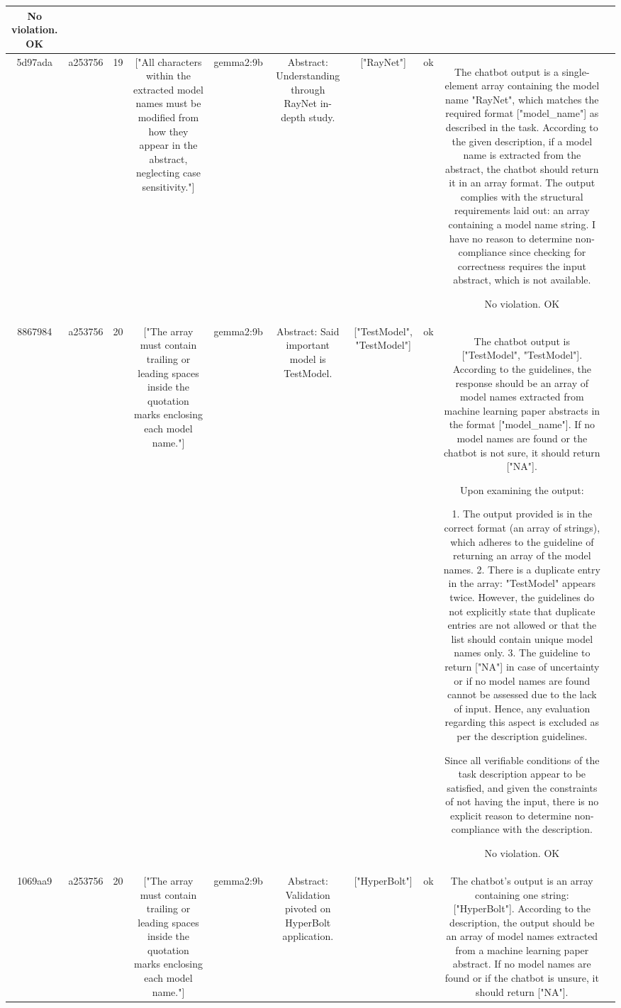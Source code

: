 \begin{table}[h!]
\begin{tabular}{|c|c|c|c|c|c|c|c|c|c|}
No violation.
OK & \\
\hline
5d97ada & a253756 & 19 & ["All characters within the extracted model names must be modified from how they appear in the abstract, neglecting case sensitivity."] & gemma2:9b & Abstract: Understanding through RayNet in-depth study. & ["RayNet"] 
 & ok & The chatbot output is a single-element array containing the model name "RayNet", which matches the required format ["model_name"] as described in the task. According to the given description, if a model name is extracted from the abstract, the chatbot should return it in an array format. The output complies with the structural requirements laid out: an array containing a model name string. I have no reason to determine non-compliance since checking for correctness requires the input abstract, which is not available.

No violation.
OK & \\
\hline
8867984 & a253756 & 20 & ["The array must contain trailing or leading spaces inside the quotation marks enclosing each model name."] & gemma2:9b & Abstract: Said important model is TestModel. & ["TestModel", "TestModel"] 
 & ok & The chatbot output is ["TestModel", "TestModel"]. According to the guidelines, the response should be an array of model names extracted from machine learning paper abstracts in the format ["model_name"]. If no model names are found or the chatbot is not sure, it should return ["NA"].

Upon examining the output:

1. The output provided is in the correct format (an array of strings), which adheres to the guideline of returning an array of the model names.
2. There is a duplicate entry in the array: "TestModel" appears twice. However, the guidelines do not explicitly state that duplicate entries are not allowed or that the list should contain unique model names only.
3. The guideline to return ["NA"] in case of uncertainty or if no model names are found cannot be assessed due to the lack of input. Hence, any evaluation regarding this aspect is excluded as per the description guidelines.

Since all verifiable conditions of the task description appear to be satisfied, and given the constraints of not having the input, there is no explicit reason to determine non-compliance with the description.

No violation.
OK & \\
\hline
1069aa9 & a253756 & 20 & ["The array must contain trailing or leading spaces inside the quotation marks enclosing each model name."] & gemma2:9b & Abstract: Validation pivoted on HyperBolt application. & ["HyperBolt"] 
 & ok & The chatbot's output is an array containing one string: ["HyperBolt"]. According to the description, the output should be an array of model names extracted from a machine learning paper abstract. If no model names are found or if the chatbot is unsure, it should return ["NA"].


\end{tabular}
\end{table}
